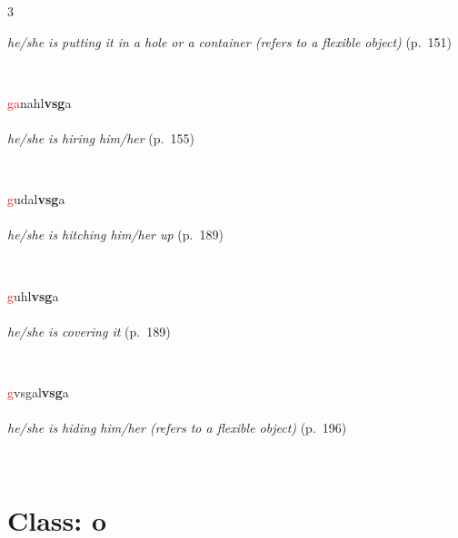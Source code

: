 \documentclass[oneside,openany]{book}%
\begin{document}
\begin{multicols}{3}
\begin{minipage}[t]{\linewidth}
\noindent \textit{he/she is putting it in a hole or a container (refers to a flexible object)} (p.~151)
\end{minipage}\\[1em]%
\begin{minipage}[t]{\linewidth}
\raggedright\noindent \textcolor{Red}{ga}nahl\textbf{vsg}a\\
\\
\noindent \textit{he/she is hiring him/her} (p.~155)
\end{minipage}\\[1em]%
\begin{minipage}[t]{\linewidth}
\raggedright\noindent \textcolor{Red}{g}udal\textbf{vsg}a\\
\\
\noindent \textit{he/she is hitching him/her up} (p.~189)
\end{minipage}\\[1em]%
\begin{minipage}[t]{\linewidth}
\raggedright\noindent \textcolor{Red}{g}uhl\textbf{vsg}a\\
\\
\noindent \textit{he/she is covering it} (p.~189)
\end{minipage}\\[1em]%
\begin{minipage}[t]{\linewidth}
\raggedright\noindent \textcolor{Red}{g}vsgal\textbf{vsg}a\\
\\
\noindent \textit{he/she is hiding him/her (refers to a flexible object)} (p.~196)
\end{minipage}\\[1em]%
\end{multicols}%
\vspace{1em}%
\needspace{3in}%
\section*{Class: o}%
%
\needspace{1.5in}%
\end{document}
